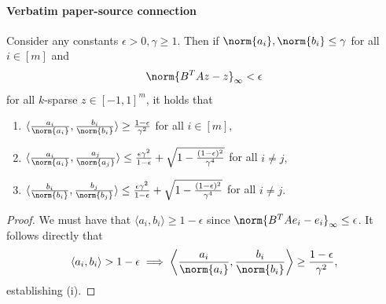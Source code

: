 \documentclass[10pt]{article}
\begin{document}
\paragraph{Verbatim paper-source connection}
\begin{ReviewVerbatim}
\begin{proposition}\label{prop:geometry-2}
    Consider any constants $\epsilon > 0, \gamma \ge 1$. Then if $\norm{a_i},\norm{b_i} \le \gamma$ for all $i\in [m]$ and
    \begin{equation}
        \norm{B^TAz - z}_\infty < \epsilon
    \end{equation}
    for all $k$-sparse $z\in [-1,1]^m$, it holds that
    \begin{enumerate}
        \item[(i)] $\langle \frac{a_i}{\norm{a_i}}, \frac{b_i}{\norm{b_i}}\rangle \ge \frac{1-\epsilon}{\gamma^2}$ for all $i\in [m],$
        \item[(ii)] $\langle \frac{a_i}{\norm{a_i}}, \frac{a_j}{\norm{a_j}}\rangle \le \frac{\epsilon\gamma^2}{1 - \epsilon} + \sqrt{1 - \frac{(1 - \epsilon)^2}{\gamma^4}}$ for all $i\neq j,$
        \item[(iii)] $\langle \frac{b_i}{\norm{b_i}}, \frac{b_j}{\norm{b_j}}\rangle \le \frac{\epsilon\gamma^2}{1 - \epsilon} + \sqrt{1 - \frac{(1 - \epsilon)^2}{\gamma^4}}$ for all $i\neq j.$
    \end{enumerate}
\end{proposition}

\begin{proof}
    We must have that $\langle a_i, b_i\rangle \ge 1 - \epsilon$ since $\norm{B^TAe_i - e_i}_\infty \le \epsilon$. It follows directly that
    \begin{equation}
       \langle a_i, b_i \rangle > 1 - \epsilon \implies \left\langle\frac{a_i}{\norm{a_i}}, \frac{b_i}{\norm{b_i}}\right\rangle \ge \frac{1-\epsilon}{\gamma^2},
    \end{equation}
    establishing (i).


\end{proof}
\end{ReviewVerbatim}
\end{document}
